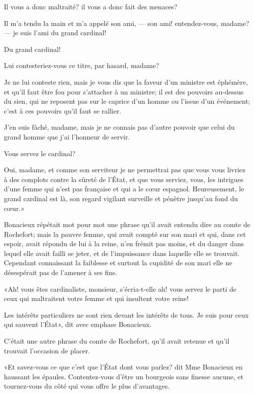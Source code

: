 \speak  Il vous a donc maltraité? il vous a donc fait des menaces? 

\speak  Il m'a tendu la main et m'a appelé son ami, --- son ami! entendez-vous, madame? --- je suis l'ami du grand cardinal! 

\speak  Du grand cardinal! 

\speak  Lui contesteriez-vous ce titre, par hasard, madame? 

\speak  Je ne lui conteste rien, mais je vous dis que la faveur d'un ministre est éphémère, et qu'il faut être fou pour s'attacher à un ministre; il est des pouvoirs au-dessus du sien, qui ne reposent pas sur le caprice d'un homme ou l'issue d'un événement; c'est à ces pouvoirs qu'il faut se rallier. 

\speak  J'en suis fâché, madame, mais je ne connais pas d'autre pouvoir que celui du grand homme que j'ai l'honneur de servir. 

\speak  Vous servez le cardinal? 

\speak  Oui, madame, et comme son serviteur je ne permettrai pas que vous vous livriez à des complots contre la sûreté de l'État, et que vous serviez, vous, les intrigues d'une femme qui n'est pas française et qui a le cœur espagnol. Heureusement, le grand cardinal est là, son regard vigilant surveille et pénètre jusqu'au fond du cœur.» 

Bonacieux répétait mot pour mot une phrase qu'il avait entendu dire au comte de Rochefort; mais la pauvre femme, qui avait compté sur son mari et qui, dans cet espoir, avait répondu de lui à la reine, n'en frémit pas moins, et du danger dans lequel elle avait failli se jeter, et de l'impuissance dans laquelle elle se trouvait. Cependant connaissant la faiblesse et surtout la cupidité de son mari elle ne désespérait pas de l'amener à ses fins. 

«Ah! vous êtes cardinaliste, monsieur, s'écria-t-elle ah! vous servez le parti de ceux qui maltraitent votre femme et qui insultent votre reine! 

\speak  Les intérêts particuliers ne sont rien devant les intérêts de tous. Je suis pour ceux qui sauvent l'État», dit avec emphase Bonacieux. 

C'était une autre phrase du comte de Rochefort, qu'il avait retenue et qu'il trouvait l'occasion de placer. 

«Et savez-vous ce que c'est que l'État dont vous parlez? dit Mme Bonacieux en haussant les épaules. Contentez-vous d'être un bourgeois sans finesse aucune, et tournez-vous du côté qui vous offre le plus d'avantages. 

